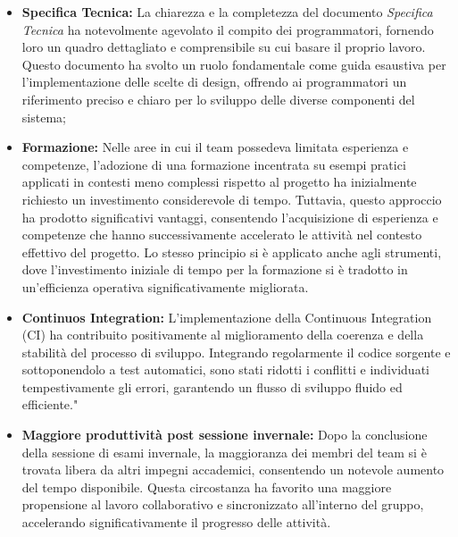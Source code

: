 \begin{itemize}
    \item \textbf{Specifica Tecnica:} La chiarezza e la completezza del documento \textit{Specifica Tecnica} ha notevolmente agevolato il compito dei programmatori, fornendo loro un quadro dettagliato e comprensibile su cui basare il proprio lavoro. Questo documento ha svolto un ruolo fondamentale come guida esaustiva per l'implementazione delle scelte di design, offrendo ai programmatori un riferimento preciso e chiaro per lo sviluppo delle diverse componenti del sistema;
    \item \textbf{Formazione:} Nelle aree in cui il team possedeva limitata esperienza e competenze, l'adozione di una formazione incentrata su esempi pratici applicati in contesti meno complessi rispetto al progetto ha inizialmente richiesto un investimento considerevole di tempo. Tuttavia, questo approccio ha prodotto significativi vantaggi, consentendo l'acquisizione di esperienza e competenze che hanno successivamente accelerato le attività nel contesto effettivo del progetto. Lo stesso principio si è applicato anche agli strumenti, dove l'investimento iniziale di tempo per la formazione si è tradotto in un'efficienza operativa significativamente migliorata.
    \item \textbf{Continuos Integration:} L'implementazione della Continuous Integration (CI) ha contribuito positivamente al miglioramento della coerenza e della stabilità del processo di sviluppo. Integrando regolarmente il codice sorgente e sottoponendolo a test automatici, sono stati ridotti i conflitti e individuati tempestivamente gli errori, garantendo un flusso di sviluppo fluido ed efficiente."
    \item \textbf{Maggiore produttività post sessione invernale:} Dopo la conclusione della sessione di esami invernale, la maggioranza dei membri del team si è trovata libera da altri impegni accademici, consentendo un notevole aumento del tempo disponibile. Questa circostanza ha favorito una maggiore propensione al lavoro collaborativo e sincronizzato all'interno del gruppo, accelerando significativamente il progresso delle attività.
\end{itemize}